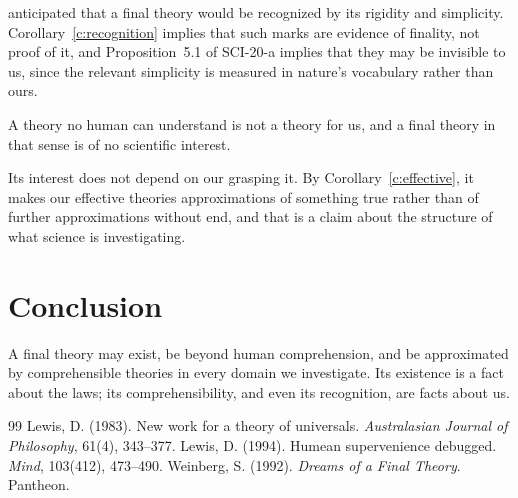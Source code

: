 \documentclass{situationist-preprint}
\begin{document}
\citet{Weinberg1992} anticipated that a final theory would be recognized by its rigidity and simplicity. Corollary~\ref{c:recognition} implies that such marks are evidence of finality, not proof of it, and Proposition~5.1 of SCI-20-a implies that they may be invisible to us, since the relevant simplicity is measured in nature's vocabulary rather than ours.

\begin{objection}
A theory no human can understand is not a theory for us, and a final theory in that sense is of no scientific interest.
\end{objection}

\begin{reply}
Its interest does not depend on our grasping it. By Corollary~\ref{c:effective}, it makes our effective theories approximations of something true rather than of further approximations without end, and that is a claim about the structure of what science is investigating.
\end{reply}

\section{Conclusion}

A final theory may exist, be beyond human comprehension, and be approximated by comprehensible theories in every domain we investigate. Its existence is a fact about the laws; its comprehensibility, and even its recognition, are facts about us.

\begin{thebibliography}{99}\small
{} Lewis, D. (1983). New work for a theory of universals. \emph{Australasian Journal of Philosophy}, 61(4), 343--377.
 Lewis, D. (1994). Humean supervenience debugged. \emph{Mind}, 103(412), 473--490.
 Weinberg, S. (1992). \emph{Dreams of a Final Theory}. Pantheon.
\end{thebibliography}
\end{document}
